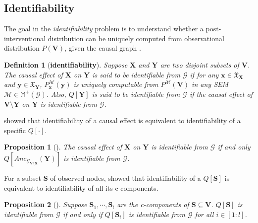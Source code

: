 \documentclass[accepted]{uai2022}
\newtheorem{proposition}{Proposition}
\newtheorem{definition}{Definition}
\newcommand{\Anc}[2]{\textit{Anc}_{#2}(#1)}
\newcommand{\V}[0]{\mathbf{V}}
\newcommand{\X}[0]{\mathbf{X}}
\newcommand{\Y}[0]{\mathbf{Y}}
\newcommand{\x}[0]{\mathbf{x}}
\newcommand{\y}[0]{\mathbf{y}}
\newcommand{\G}[0]{\mathcal{G}}
\newcommand{\M}[0]{\mathcal{M}}
\newcommand{\dom}[1]{\mathfrak{X}_{#1}}
\begin{document}
    \subsection{Identifiability}    
        The goal in the \emph{identifiability} problem is to understand whether a post-interventional distribution can be uniquely computed from observational distribution $P(\V)$, given the causal graph \citep{pearl2009causality}.
        
        \begin{definition} [\textbf{identifiability}] \label{def: id}
            Suppose $\X$ and $\Y$ are two disjoint subsets of $\V$.
            The causal effect of $\X$ on $\Y$ is said to be identifiable from $\G$ if for any $\x \in \dom{\X}$ and $\y \in \dom{\Y}$, $P^{\M}_{\x}(\y)$ is uniquely computable from $P^{\M}(\mathbf{V})$ in any SEM $\mathcal{M} \in \mathbb{M}^{+}(\G)$.
            Also, $Q[\Y]$ is said to be identifiable from $\G$ if the causal effect of $\V \setminus \Y$ on $\Y$ is identifiable from $\G$.
        \end{definition}
        \cite{huang2008completeness} showed that identifiability of a causal effect is equivalent to identifiability of a specific $Q[\cdot]$.
        \begin{proposition}[\cite{huang2008completeness}]\label{prp: 1}
            The causal effect of $\X$ on $\Y$ is identifiable from $\G$ if and only $Q[\Anc{\Y}{\G_{\V \setminus \X}}]$ is identifiable from $\G$.
        \end{proposition}
        For a subset $\textbf{S}$ of observed nodes, \citep{tian2003ID} showed that identifiability of a $Q[\textbf{S}]$ is equivalent to identifiability of all its c-components.
        \begin{proposition}[\cite{tian2003ID}] \label{prp: 2}
            Suppose $\mathbf{S}_1,\cdots,\mathbf{S}_l$ are the c-components of $\mathbf{S}\subseteq \V$. $Q[\mathbf{S}]$ is identifiable from $\G$ if and only if $Q[\mathbf{S}_i]$ is identifiable from $\G$ for all $i\in [1:l]$.
        \end{proposition}
        
\end{document}
